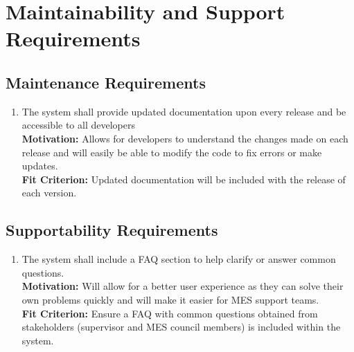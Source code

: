 \documentclass[12pt]{article}
\begin{document}
\section{Maintainability and Support Requirements}
\subsection{Maintenance Requirements}
\begin{enumerate}[align=left,
  leftmargin=*,
  labelsep=1em,
  itemindent=0em,
  label=\bfseries MT-\arabic*:,
  ref=\bfseries MT-\arabic*]
  \item \label{MSMR1} The system shall provide updated documentation upon every release and be accessible to all developers\\[2mm]
    {\bf Motivation:} Allows for developers to understand the changes made on each release and will easily be able to modify the code to fix errors or make updates. \\
    {\bf Fit Criterion:} Updated documentation will be included with the release of each version.
\end{enumerate}
\subsection{Supportability Requirements}
\begin{enumerate}[align=left,
  leftmargin=*,
  labelsep=1em,
  itemindent=0em,
  label=\bfseries SU-\arabic*:,
  ref=\bfseries SU-\arabic*]
  \item \label{MSSR1} The system shall include a FAQ section to help clarify or answer common questions.\\[2mm]
    {\bf Motivation:} Will allow for a better user experience as they can solve their own problems quickly and will make it easier for MES support teams. \\
    {\bf Fit Criterion:} Ensure a FAQ with common questions obtained from stakeholders (supervisor and MES council members) is included within the system.
\end{enumerate}
\end{document}

